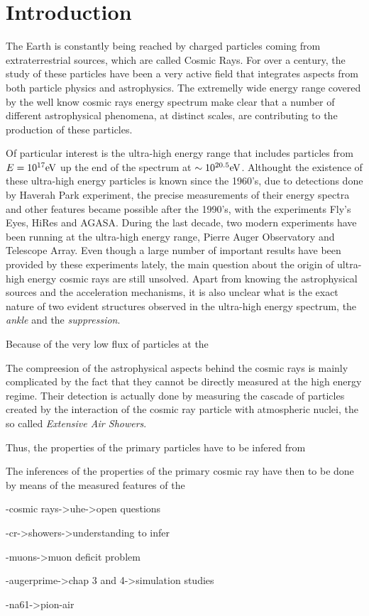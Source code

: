 \chapter[Introduction]{Introduction}
\label{sec:introduction}

The Earth is constantly being reached by charged particles
coming from extraterrestrial sources, which are called Cosmic Rays.
For over a century, the study of these particles have been a very active field
that integrates aspects from both particle physics and astrophysics.
The extremelly wide energy range covered by the well know cosmic rays
energy spectrum make clear that a number of different astrophysical phenomena,
at distinct scales, are contributing to the production of these particles.

Of particular interest is the ultra-high energy range that includes
particles from $E=\mbox{$10^{17}$} \mbox{e\kern-0.1em V}$ up the end of the spectrum at $\sim\mbox{$10^{20.5}$} \mbox{e\kern-0.1em V}$. 
Althought the existence of these ultra-high energy particles is known
since the 1960's, due to detections done by Haverah Park experiment,
the precise measurements of their energy spectra and other features
became possible after the 1990's, with the experiments Fly's Eyes,
HiRes and AGASA. During the last decade, two modern experiments have
been running at the ultra-high energy range, Pierre Auger Observatory
and Telescope Array. 
Even though a large number of important results have been provided
by these experiments lately, the main question about the origin
of ultra-high energy cosmic rays are still unsolved. 
Apart from knowing the astrophysical sources and the acceleration
mechanisms, it is also unclear what is the exact nature of two evident structures
observed in the ultra-high energy spectrum, the \emph{ankle} and the \emph{suppression}.




Because of the very low flux of particles at the 



The compreesion of the astrophysical aspects behind the cosmic rays
is mainly complicated by the fact that they cannot be directly measured
at the high energy regime. Their detection is actually done by measuring
the cascade of particles created by the interaction of the cosmic ray particle
with atmospheric nuclei, the so called \emph{Extensive Air Showers}.  


Thus, the properties of the primary particles have to be infered from


The inferences of the properties of the primary cosmic ray have then
to be done by means of the measured features of the 





-cosmic rays->uhe->open questions

-cr->showers->understanding to infer

-muons->muon deficit problem

-augerprime->chap 3 and 4->simulation studies

-na61->pion-air






